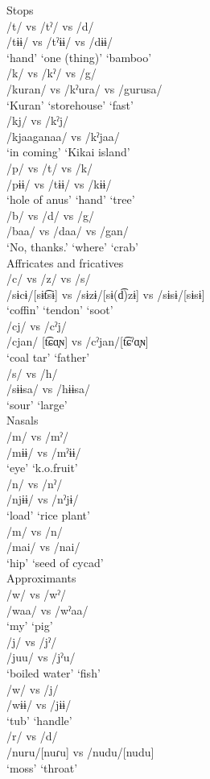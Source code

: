\ea Stops\\
\ea /t/ vs /tˀ/ vs /d/\\
\gll /tɨɨ/ vs /tˀɨɨ/ vs /dɨɨ/\\
‘hand’ {} ‘one (thing)’ {} ‘bamboo’\\
\ex /k/ vs /kˀ/ vs /g/\\
\gll /kuran/ vs /kˀura/ vs /gurusa/\\
‘Kuran’ {} ‘storehouse’ {} ‘fast’\\
\ex /kj/ vs /kˀj/\\
\gll /kjaaganaa/ vs /kˀjaa/\\
‘in coming’ {} ‘Kikai island’\\
\ex /p/ vs /t/ vs /k/\\
\gll /pɨɨ/ vs /tɨɨ/ vs /kɨɨ/\\
‘hole of anus’ {} ‘hand’ {} ‘tree’\\
\ex /b/ vs /d/ vs /g/\\
\gll /baa/ vs /daa/ vs /gan/\\
‘No, thanks.’ {} ‘where’ {} ‘crab’\\
\z
\ex  Affricates and fricatives\\
\ea /c/ vs /z/ vs /s/\\
\gll /sɨcɨ/[sɨt͡sɨ] vs /sɨzɨ/[sɨ(d͡)zɨ] vs /sɨsɨ/[sɨsɨ]\\
‘coffin’ {} ‘tendon’ {} ‘soot’\\
\ex /cj/ vs /cˀj/\\
\gll /cjan/ [t͡ɕɑ̟ɴ] vs /cˀjan/[t͡ɕˀɑ̟ɴ]\\
‘coal tar’ {} ‘father’\\
\ex /s/ vs /h/\\
\gll /sɨɨsa/ vs /hɨɨsa/\\
‘sour’ {} ‘large’\\
\z
\ex  Nasals\\
\ea /m/ vs /mˀ/\\
\gll /mɨɨ/ vs /mˀɨɨ/\\
‘eye’ {}  ‘k.o.fruit’\\
\ex /n/ vs /nˀ/\\
\gll /njɨɨ/ vs /nˀjɨ/\\
‘load’ {}  ‘rice plant’\\
\ex /m/ vs /n/\\
\gll /mai/ vs /nai/\\
‘hip’ {}  ‘seed of cycad’\\
\z
\ex Approximants\\
\ea /w/ vs /wˀ/\\
\gll /waa/ vs /wˀaa/\\
‘my’ {}  ‘pig’\\
\ex /j/ vs /jˀ/\\
\gll /juu/ vs /jˀu/\\
‘boiled water’ {}  ‘fish’\\
\ex /w/ vs /j/\\
\gll /wɨɨ/ vs /jɨɨ/\\
‘tub’ {}  ‘handle’\\
\ex /r/ vs /d/\\
\gll /nuru/[nuɾu] vs /nudu/[nudu]\\
‘moss’ {}  ‘throat’\\
\z
\z


